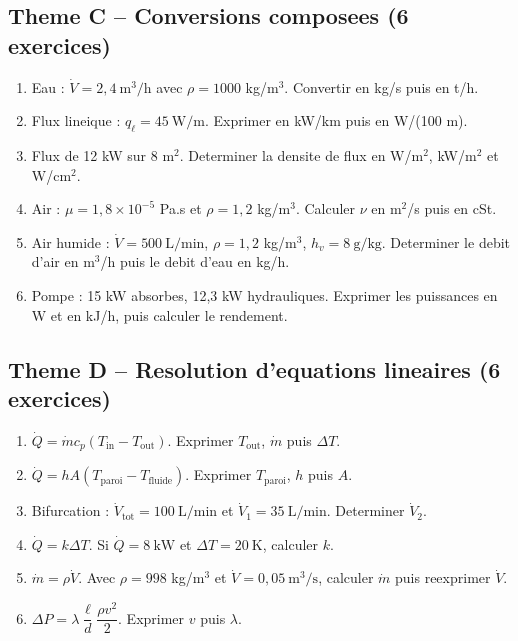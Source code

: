 \subsection*{Theme C -- Conversions composees (6 exercices)}
\begin{enumerate}[label=\textbf{C\arabic*}, leftmargin=1.8cm, itemsep=0.4em]
  \item Eau : $\dot{V} = 2{,}4~\mathrm{m^3/h}$ avec $\rho = 1000$ kg/m$^3$. Convertir en kg/s puis en t/h.
  \item Flux lineique : $q_{\ell} = 45~\mathrm{W/m}$. Exprimer en kW/km puis en W/(100 m).
  \item Flux de 12 kW sur 8 m$^2$. Determiner la densite de flux en W/m$^2$, kW/m$^2$ et W/cm$^2$.
  \item Air : $\mu = 1{,}8 \times 10^{-5}$ Pa.s et $\rho = 1{,}2$ kg/m$^3$. Calculer $\nu$ en m$^2$/s puis en cSt.
  \item Air humide : $\dot{V} = 500~\mathrm{L/min}$, $\rho = 1{,}2$ kg/m$^3$, $h_v = 8~\mathrm{g/kg}$. Determiner le debit d'air en m$^3$/h puis le debit d'eau en kg/h.
  \item Pompe : 15 kW absorbes, 12,3 kW hydrauliques. Exprimer les puissances en W et en kJ/h, puis calculer le rendement.
\end{enumerate}

\subsection*{Theme D -- Resolution d'equations lineaires (6 exercices)}
\begin{enumerate}[label=\textbf{D\arabic*}, leftmargin=1.8cm, itemsep=0.4em]
  \item $\dot{Q} = \dot{m} c_p (T_{\mathrm{in}} - T_{\mathrm{out}})$. Exprimer $T_{\mathrm{out}}$, $\dot{m}$ puis $\Delta T$.
  \item $\dot{Q} = h A (T_{\mathrm{paroi}} - T_{\mathrm{fluide}})$. Exprimer $T_{\mathrm{paroi}}$, $h$ puis $A$.
  \item Bifurcation : $\dot{V}_{\mathrm{tot}} = 100~\mathrm{L/min}$ et $\dot{V}_1 = 35~\mathrm{L/min}$. Determiner $\dot{V}_2$.
  \item $\dot{Q} = k \Delta T$. Si $\dot{Q} = 8~\mathrm{kW}$ et $\Delta T = 20~\mathrm{K}$, calculer $k$.
  \item $\dot{m} = \rho \dot{V}$. Avec $\rho = 998$ kg/m$^3$ et $\dot{V} = 0{,}05~\mathrm{m^3/s}$, calculer $\dot{m}$ puis reexprimer $\dot{V}$.
  \item $\Delta P = \lambda \dfrac{\ell}{d} \dfrac{\rho v^2}{2}$. Exprimer $v$ puis $\lambda$.
\end{enumerate}

